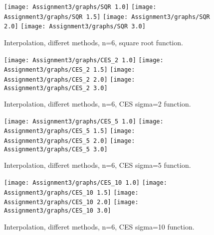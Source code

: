 \documentclass[]{article}
\begin{document}
\begin{figure}

{\centering \texttt{[image: Assignment3/graphs/SQR 1.0]} \texttt{[image: Assignment3/graphs/SQR 1.5]} \texttt{[image: Assignment3/graphs/SQR 2.0]} \texttt{[image: Assignment3/graphs/SQR 3.0]} 

}

\caption{Interpolation, differet methods, n=6, square root function.}\label{fig:unnamed-chunk-9}
\end{figure}

\begin{figure}

{\centering \texttt{[image: Assignment3/graphs/CES\_2 1.0]} \texttt{[image: Assignment3/graphs/CES\_2 1.5]} \texttt{[image: Assignment3/graphs/CES\_2 2.0]} \texttt{[image: Assignment3/graphs/CES\_2 3.0]} 

}

\caption{Interpolation, differet methods, n=6, CES sigma=2 function.}\label{fig:unnamed-chunk-10}
\end{figure}

\begin{figure}

{\centering \texttt{[image: Assignment3/graphs/CES\_5 1.0]} \texttt{[image: Assignment3/graphs/CES\_5 1.5]} \texttt{[image: Assignment3/graphs/CES\_5 2.0]} \texttt{[image: Assignment3/graphs/CES\_5 3.0]} 

}

\caption{Interpolation, differet methods, n=6, CES sigma=5 function.}\label{fig:unnamed-chunk-11}
\end{figure}

\begin{figure}

{\centering \texttt{[image: Assignment3/graphs/CES\_10 1.0]} \texttt{[image: Assignment3/graphs/CES\_10 1.5]} \texttt{[image: Assignment3/graphs/CES\_10 2.0]} \texttt{[image: Assignment3/graphs/CES\_10 3.0]} 

}

\caption{Interpolation, differet methods, n=6, CES sigma=10 function.}\label{fig:unnamed-chunk-12}
\end{figure}
\end{document}
